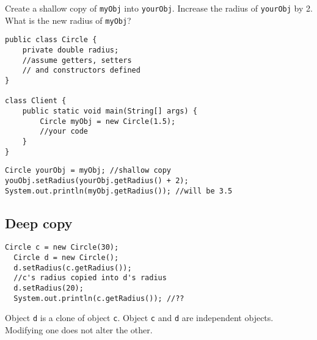 \begin{exercise}
Create a shallow copy of \texttt{myObj} into \texttt{yourObj}. Increase the radius of \texttt{yourObj} by 2. What is the new radius of \texttt{myObj}?

\begin{lstlisting}[frame=single,style=buggy]
public class Circle {
	private double radius;
	//assume getters, setters 
	// and constructors defined
}

class Client {
	public static void main(String[] args) {
		Circle myObj = new Circle(1.5);
		//your code
	}
}
\end{lstlisting}  	
\end{exercise}
\begin{answer} \begin{lstlisting}
Circle yourObj = myObj; //shallow copy
youObj.setRadius(yourObj.getRadius() + 2);
System.out.println(myObj.getRadius()); //will be 3.5
\end{lstlisting} \end{answer}


\subsection{Deep copy}
  \begin{lstlisting}[style=correct,basicstyle=\footnotesize]
  Circle c = new Circle(30);
  Circle d = new Circle();
  d.setRadius(c.getRadius());
  //c's radius copied into d's radius
  d.setRadius(20);
  System.out.println(c.getRadius()); //??
  \end{lstlisting}    
  
  Object \texttt{d} is a clone of object \texttt{c}. Object \texttt{c} and \texttt{d} are independent objects. Modifying one does not alter the other.

\begin{center}
\bgroup \tikzset{png export}  \egroup
\end{center}


